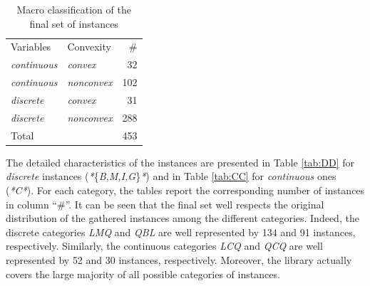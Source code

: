 \begin{table}
{
 \centering
 \setlength{\tabcolsep}{18pt}
 \renewcommand \arraystretch{1.1}
\begin{tabular}{llr}
\toprule
Variables & Convexity & \#\\
\cmidrule(lr){1-3}
%
 \textit{continuous}	& \textit{convex}		&  32 \\[1.2 ex]
 \textit{continuous}	& \textit{nonconvex} 	&  102 \\[1.2 ex]
 \textit{discrete}	& \textit{convex}		&  31 \\[1.2 ex]
 \textit{discrete}	& \textit{nonconvex}	&  288 \\[1.2 ex]
\cmidrule(lr){1-3}
Total		&				& 453\\
%
\bottomrule
\end{tabular}
\caption{Macro classification of the final set of instances}
\label{tab:DDDDD}
}
\end{table}

 The detailed characteristics of the instances are presented in Table
\ref{tab:DD} for \emph{discrete} instances
(\textit{*}\{\textit{B,M,I,G}\}\textit{*}) and in Table
\ref{tab:CC} for \emph{continuous} ones (\textit{*C*}).
For each category, the tables
report the corresponding number of instances in column ``$\#$''. It can be seen
that the final set well respects the original distribution of the gathered
instances among the different categories. Indeed, the discrete categories
\textit{LMQ} and \textit{QBL} are well represented by {134} and {91}
instances, respectively. Similarly, the continuous categories
\textit{LCQ} and \textit{QCQ} are well
represented by {52} and {30} instances, respectively. Moreover, the library
actually covers the large majority of all possible categories of instances.

